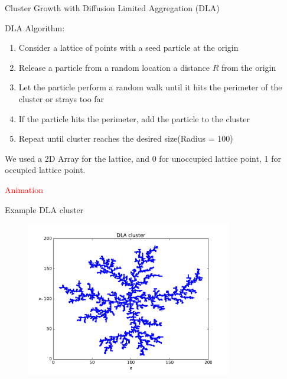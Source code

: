 \documentclass{beamer}
\begin{document}
\begin{frame}{Cluster Growth with Diffusion Limited Aggregation (DLA)}
	
	DLA Algorithm:
	
	\begin{enumerate}
		
		\item Consider a lattice of points with a seed particle at the origin
		
		\item Release a particle from a random location a distance $R$ from the origin
		
		\item Let the particle perform a random walk until it hits the perimeter of the cluster or strays too far
		
		\item If the particle hits the perimeter, add the particle to the cluster
		
		\item Repeat until cluster reaches the desired size(Radius = 100)
	\end{enumerate}
	We used a 2D Array for the lattice, and 0 for unoccupied lattice point, 1 for occupied lattice point. 
	
	\textcolor{red}{Animation}
\end{frame}

\begin{frame}{Example DLA cluster}
	
	\begin{figure}[H]
		\centering
		\includegraphics[width=0.8\textwidth]{dla.pdf}
	\end{figure}
	
\end{frame}
\end{document}
